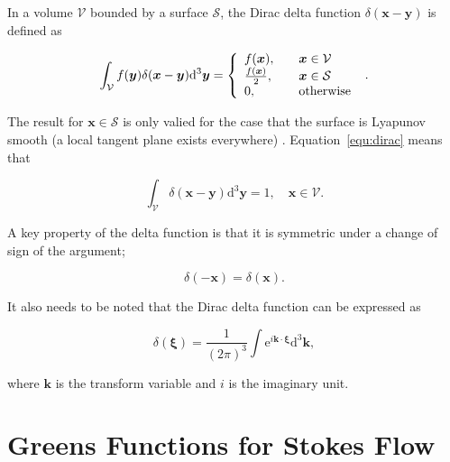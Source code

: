 \documentclass[12pt]{article}
\begin{document}
In a volume $\mathcal{V}$ bounded by a surface $\mathcal{S}$, the Dirac delta function $\delta(\boldsymbol{x} - \boldsymbol{y})$ is defined as \citep{Riley06}

\begin{equation}
\label{equ:dirac}
\int_{\mathcal{V}} f(\boldsymbol{y}) \delta(\boldsymbol{x} - \boldsymbol{y}) \mathrm{d}^{3} \boldsymbol{y} = \left\{
    \begin{array}{l l}
      f(\boldsymbol{x}), &\quad \boldsymbol{x} \in \mathcal{V} \\
      \frac{f(\boldsymbol{x})}{2}, &\quad \boldsymbol{x} \in \mathcal{S} \\
      0, & \quad \text{otherwise}
\end{array}
\right.\ .
\end{equation}

The result for $\boldsymbol{x} \in \mathcal{S}$ is only valied for the case that the surface is Lyapunov smooth (a local tangent plane exists everywhere) \citep{Gunter67}. Equation~\ref{equ:dirac} means that

\begin{equation}
\label{equ:delta_int}
\int_{\mathcal{V}} \delta(\boldsymbol{x} - \boldsymbol{y}) \mathrm{d}^{3} \boldsymbol{y} = 1, \quad \boldsymbol{x} \in \mathcal{V}.
\end{equation}

A key property of the delta function is that it is symmetric under a change of sign of the argument;

\begin{equation}
\label{equ:delta_sym}
\delta(-\boldsymbol{x}) = \delta(\boldsymbol{x}).
\end{equation}

It also needs to be noted that the Dirac delta function can be expressed as \citep{Riley06}

\begin{equation}
\label{equ:delta_int_def}
\delta (\boldsymbol{\xi}) = \frac{1}{(2 \pi)^{3}} \int \mathrm{e}^{i \boldsymbol{k} \cdot \boldsymbol{\xi}} \mathrm{d}^{3} \boldsymbol{k},
\end{equation}

where $\boldsymbol{k}$ is the transform variable and $i$ is the imaginary unit.

\section{Greens Functions for Stokes Flow}
\label{app:Greens}
\end{document}
